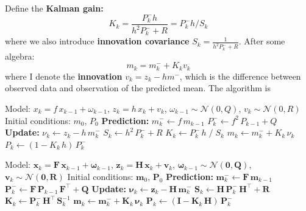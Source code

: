 \documentclass{article}
\begin{document}
Define the \textbf{Kalman gain:}
\begin{equation}
K_k = \frac{P_k^- h}{h^2 P_k^- + R} =P_k^- h / S_k
\end{equation}
where we also introduce  \textbf{innovation covariance} $S_k=\frac{1}{h^2 P_k^- + R}$. After some algebra:
\begin{equation}
m_k = m_k^- + K_k v_k
\end{equation}
where I denote the  \textbf{innovation} $v_k=z_k-hm^-$, which is the difference between observed data and observation of the predicted mean. The algorithm is
\begin{algorithm}[H]
\caption{Kalman Filter (1-d, additive noise)}
\begin{algorithmic}[1]
\REQUIRE Model: $x_k = f\,x_{k-1} + \omega_{k-1}$, $z_k = h\,x_k + v_k$,
  $\omega_{k-1} \sim \mathcal{N}(0,Q)$, $v_k \sim \mathcal{N}(0,R)$
\REQUIRE Initial conditions: $m_0$, $P_0$
  \STATE \textbf{Prediction:}
  \STATE $m_k^- \leftarrow f\,m_{k-1}$
  \STATE $P_k^- \leftarrow f^2\,P_{k-1} + Q$
  \STATE \textbf{Update:}
  \STATE $\nu_k \leftarrow z_k - h\,m_k^-$
  \STATE $S_k \leftarrow h^2\,P_k^- + R$
  \STATE $K_k \leftarrow P_k^-\,h\;/\;S_k$
  \STATE $m_k \leftarrow m_k^- + K_k\,\nu_k$
  \STATE $P_k \leftarrow (1 - K_k\,h)\,P_k^-$
\ENDFOR
\end{algorithmic}
\end{algorithm}

\begin{algorithm}[H]
\caption{Kalman Filter (vector, additive noise)}
\begin{algorithmic}[1]
\REQUIRE Model: $\mathbf{x}_k = \mathbf{F}\,\mathbf{x}_{k-1} + \boldsymbol{\omega}_{k-1}$,
  $\mathbf{z}_k = \mathbf{H}\,\mathbf{x}_k + \mathbf{v}_k$,
  $\boldsymbol{\omega}_{k-1} \sim \mathcal{N}(\mathbf{0},\mathbf{Q})$,
  $\mathbf{v}_k \sim \mathcal{N}(\mathbf{0},\mathbf{R})$
\REQUIRE Initial conditions: $\mathbf{m}_0$, $\mathbf{P}_0$
  \STATE \textbf{Prediction:}
  \STATE $\mathbf{m}_k^- \leftarrow \mathbf{F}\,\mathbf{m}_{k-1}$
  \STATE $\mathbf{P}_k^- \leftarrow \mathbf{F}\,\mathbf{P}_{k-1}\,\mathbf{F}^\top + \mathbf{Q}$
  \STATE \textbf{Update:}
  \STATE $\boldsymbol{\nu}_k \leftarrow \mathbf{z}_k - \mathbf{H}\,\mathbf{m}_k^-$
  \STATE $\mathbf{S}_k \leftarrow \mathbf{H}\,\mathbf{P}_k^-\,\mathbf{H}^\top + \mathbf{R}$
  \STATE $\mathbf{K}_k \leftarrow \mathbf{P}_k^-\,\mathbf{H}^\top\,\mathbf{S}_k^{-1}$
  \STATE $\mathbf{m}_k \leftarrow \mathbf{m}_k^- + \mathbf{K}_k\,\boldsymbol{\nu}_k$
  \STATE $\mathbf{P}_k \leftarrow (\mathbf{I} - \mathbf{K}_k\,\mathbf{H})\,\mathbf{P}_k^-$
\ENDFOR
\end{algorithmic}
\end{algorithm}
\end{document}
